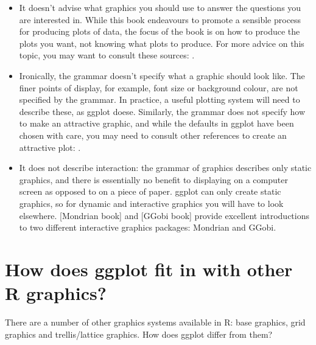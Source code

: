 \begin{itemize}
	\item It doesn't advise what graphics you should use to answer the questions you are interested in.  While this book endeavours to promote a sensible process for producing plots of data, the focus of the book is on how to produce the plots you want, not knowing what plots to produce. For more advice on this topic, you may want to consult these sources: \citet{robbins:2004,cleveland:1993,chambers:1983,tukey:1977}.

	\item Ironically, the grammar doesn't specify what a graphic should look like.  The finer points of display, for example, font size or background colour, are not specified by the grammar.  In practice, a useful plotting system will need to describe these, as ggplot doese. Similarly, the grammar does not specify how to make an attractive graphic, and while the defaults in ggplot have been chosen with care, you may need to consult other references to create an attractive plot: \citep{tufte:1990,tufte:1997,tufte:2001,tufte:2006}.

	\item It does not describe interaction: the grammar of graphics describes only static graphics, and there is essentially no benefit to displaying on a computer screen as opposed to on a piece of paper.  ggplot can only create static graphics, so for dynamic and interactive graphics you will have to look elsewhere.  [Mondrian book] and [GGobi book] provide excellent introductions to two different interactive graphics packages: Mondrian and GGobi.

\end{itemize}


\section{How does ggplot fit in with other R graphics?}

There are a number of other graphics systems available in R: base graphics, grid graphics and trellis/lattice graphics.  How does ggplot differ from them?

